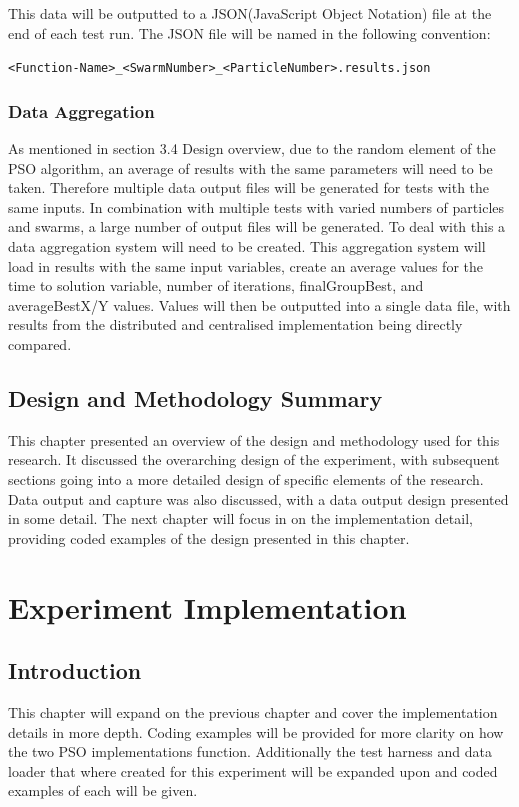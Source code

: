 \documentclass[oneside,12pt]{book}
\begin{document}
This data will be outputted to a JSON(JavaScript Object Notation) file at the end of each test run. The JSON file will be named in the following convention:

\verb|<Function-Name>_<SwarmNumber>_<ParticleNumber>.results.json|


\subsection{Data Aggregation}
As mentioned in section 3.4 Design overview, due to the random element of the PSO algorithm, an average of results with the same parameters will need to be taken. Therefore multiple data output files will be generated for tests with the same inputs. In combination with multiple tests with varied numbers of particles and swarms, a large number of output files will be generated. To deal with this a data aggregation system will need to be created. This aggregation system will load in results with the same input variables, create an average values for the time to solution variable, number of iterations, finalGroupBest, and averageBestX/Y values. Values will then be outputted  into a single data file, with results from the distributed and centralised implementation being directly compared.

\section{Design and Methodology Summary}
This chapter presented an overview of the design and methodology used for this research. It discussed the overarching design of the experiment, with subsequent sections going into a more detailed design of specific elements of the research. Data output and capture was also discussed, with a data output design presented in some detail. 
The next chapter will focus in on the implementation detail, providing coded examples of the design presented in this chapter. 

\chapter{Experiment Implementation}

\section{Introduction}
This chapter will expand on the previous chapter and cover the implementation details in more depth. Coding examples will be provided for more clarity on how the two PSO implementations function. Additionally the test harness and data loader that where created for this experiment will be expanded upon and coded examples of each will be given.
\end{document}
